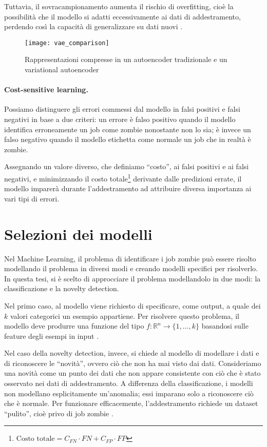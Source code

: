 Tuttavia, il sovracampionamento aumenta il rischio di overfitting, cioè la
possibilità che il modello si adatti eccessivamente ai dati di addestramento,
perdendo così la capacità di generalizzare su dati nuovi \cite{fernandez2018}.

\begin{figure}
    \centering
    \texttt{[image: vae\_comparison]}
    \caption{Rappresentazioni compresse in un autoencoder tradizionale e un
    variational autoencoder \cite{shafkat2018}}
    \label{fig:vae_comparison}
\end{figure}

\paragraph{Cost-sensitive learning.}

Possiamo distinguere gli errori commessi dal modello in falsi positivi e falsi
negativi in base a due criteri: un errore è falso positivo quando il modello
identifica erroneamente un job come zombie nonostante non lo sia; è invece un
falso negativo quando il modello etichetta come normale un job che in realtà è
zombie.

Assegnando un valore diverso, che definiamo ``costo'', ai falsi positivi e ai
falsi negativi, e minimizzando il costo totale\footnote{$\text{Costo totale} =
    C_{FN} \cdot
FN + C_{FP} \cdot FP$} derivante dalle predizioni
errate, il modello imparerà durante l'addestramento ad attribuire diversa
importanza ai vari tipi di errori.

\section{Selezioni dei modelli}
\label{sec:novelty_detection}

Nel Machine Learning, il problema di identificare i job zombie può essere
risolto modellando il problema in diversi modi e creando modelli specifici per
risolverlo. In questa tesi, si è scelto di approcciare il problema
modellandolo in due modi: la classificazione e la novelty detection.

Nel primo caso, al modello viene richiesto di specificare, come output, a
quale dei $k$ valori categorici un esempio appartiene. Per risolvere questo
problema, il modello deve produrre una funzione del tipo
$f:\mathbb{R}^n\to\{1,\ldots,k\}$ basandosi sulle feature degli esempi in
input \cite{Goodfellow2016}.

Nel caso della novelty detection, invece, si chiede al modello di modellare i
dati e di riconoscere le ``novità'', ovvero ciò che non ha mai visto dai dati.
Consideriamo una novità come un punto dei dati che non appare consistente con
ciò che è stato osservato nei dati di addestramento. A differenza della
classificazione, i  modelli non modellano esplicitamente un'anomalia; essi
imparano solo a riconoscere ciò che è normale. Per funzionare efficacemente,
l'addestramento richiede un dataset ``pulito'', cioè privo di job zombie
\cite{geron2019, pimentel2014}.

